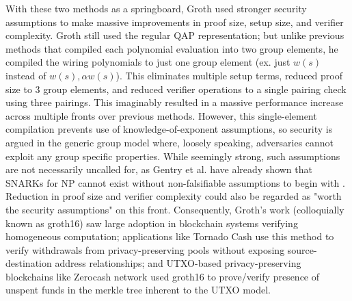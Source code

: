 \noindent With these two methods as a springboard, Groth \cite{groth16} used stronger security assumptions to make massive improvements in proof size, setup size, and verifier complexity. Groth still used the regular QAP representation; but unlike previous methods that compiled each polynomial evaluation into two group elements, he compiled the wiring polynomials to just one group element (ex. just $w(s)$ instead of $w(s), \alpha w(s)$). This eliminates multiple setup terms, reduced proof size to 3 group elements, and reduced verifier operations to a single pairing check using three pairings. This imaginably resulted in a massive performance increase across multiple fronts over previous methods. However, this single-element compilation prevents use of knowledge-of-exponent assumptions, so security is argued in the generic group model where, loosely speaking, adversaries cannot exploit any group specific properties. While seemingly strong, such assumptions are not necessarily uncalled for, as Gentry et al. have already shown that SNARKs for NP cannot exist without non-falsifiable assumptions to begin with \cite{nonfalsifiable}. Reduction in proof size and verifier complexity could also be regarded as "worth the security assumptions" on this front. Consequently, Groth's work (colloquially known as groth16) saw large adoption in blockchain systems verifying homogeneous computation; applications like Tornado Cash \cite{tornadocash} use this method to verify withdrawals from privacy-preserving pools without exposing source-destination address relationships; and UTXO-based privacy-preserving blockchains like Zerocash network \cite{zcash} used groth16 to prove/verify presence of unspent funds in the merkle tree inherent to the UTXO model.


